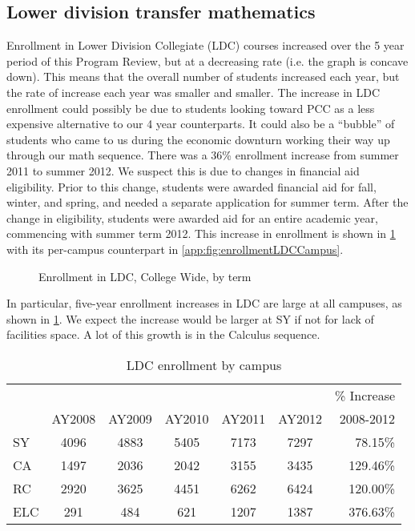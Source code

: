 \subsection{Lower division transfer mathematics}
Enrollment in Lower Division Collegiate (LDC) courses increased over the 5
year period of this Program Review, but at a decreasing rate (i.e. the graph is concave down). This means that the overall number of students increased each year, but the rate of increase each year was smaller and smaller. The increase in LDC enrollment could possibly be due to students looking toward PCC as a less expensive alternative to our 4 year counterparts. It could also be a ``bubble'' of students who came to us during the economic downturn working their way up through our math sequence.  There was a 36\% enrollment increase from summer 2011 to summer 2012. We suspect this is due to
changes in financial aid eligibility. Prior to this change, students were
awarded financial aid for fall, winter, and spring, and needed a separate
application for summer term.  After the change in eligibility, students were
awarded aid for an entire academic year, commencing with summer term 2012.
This increase in enrollment is shown in \cref{needs:fig:enrollmentLDCTerm} with
its per-campus counterpart in \vref{app:fig:enrollmentLDCCampus}.


\begin{figure}[!htb]
	\centering
	
	\caption{Enrollment in LDC, College Wide, by term}
	\label{needs:fig:enrollmentLDCTerm}
\end{figure}

In particular, five-year enrollment increases  in LDC are large at all
campuses, as shown in \cref{needs:tab:LDCenrollmentCampus}.  We expect the
increase would be larger at SY if not for lack of facilities space. A lot of
this growth is in the Calculus sequence.

\begin{table}[!htb]
	\centering
	\caption{LDC enrollment by campus}
	\label{needs:tab:LDCenrollmentCampus}
	\begin{tabular}{l*{5}{c}r}
		\toprule
		    &        &        &        &        &        & \% Increase \\
		    & AY2008 & AY2009 & AY2010 & AY2011 & AY2012 & 2008-2012   \\
		\midrule
		SY  & 4096   & 4883   & 5405   & 7173   & 7297   & 78.15\%     \\
		CA  & 1497   & 2036   & 2042   & 3155   & 3435   & 129.46\%    \\
		RC  & 2920   & 3625   & 4451   & 6262   & 6424   & 120.00\%    \\
		ELC & 291    & 484    & 621    & 1207   & 1387   & 376.63\%    \\
		\bottomrule
	\end{tabular}
\end{table}

